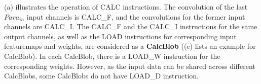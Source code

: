 (a) illustrates the operation of CALC instructions. The convolution of the last $ Para_{in} $ input channels is CALC\_F, and the convolutions for the former input channels are CALC\_I. The CALC\_F and the CALC\_I instructions for the same output channels, as well as the LOAD instructions for corresponding input featuremaps and weights, are considered as a \textbf{CalcBlob}  ((c) lists an example for CalcBlob). In each CalcBlob, there is a LOAD\_W instruction for the corresponding weights. However, as the input data can be shared across different CalcBlobs, some CalcBlobs do not have  LOAD\_D instruction. 





